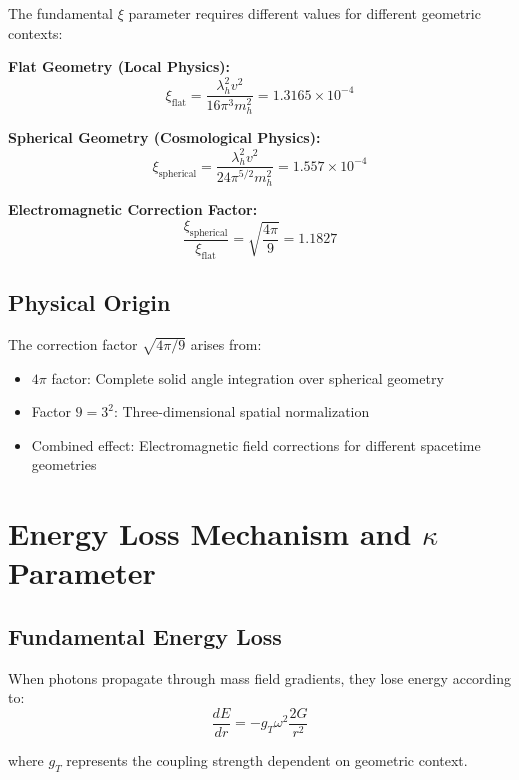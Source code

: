\documentclass[12pt,a4paper]{article}
\begin{document}
	The fundamental $\xi$ parameter requires different values for different geometric contexts:
	
	\textbf{Flat Geometry (Local Physics):}
	\begin{equation}
		\xi_{\text{flat}} = \frac{\lambda_h^2 v^2}{16\pi^3 m_h^2} = 1.3165 \times 10^{-4}
	\end{equation}
	
	\textbf{Spherical Geometry (Cosmological Physics):}
	\begin{equation}
		\xi_{\text{spherical}} = \frac{\lambda_h^2 v^2}{24\pi^{5/2} m_h^2} = 1.557 \times 10^{-4}
	\end{equation}
	
	\textbf{Electromagnetic Correction Factor:}
	\begin{equation}
		\frac{\xi_{\text{spherical}}}{\xi_{\text{flat}}} = \sqrt{\frac{4\pi}{9}} = 1.1827
	\end{equation}
	
	\subsection{Physical Origin}
	The correction factor $\sqrt{4\pi/9}$ arises from:
	\begin{itemize}
		\item $4\pi$ factor: Complete solid angle integration over spherical geometry
		\item Factor $9 = 3^2$: Three-dimensional spatial normalization
		\item Combined effect: Electromagnetic field corrections for different spacetime geometries
	\end{itemize}
	
	\section{Energy Loss Mechanism and $\kappa$ Parameter}
	
	\subsection{Fundamental Energy Loss}
	When photons propagate through mass field gradients, they lose energy according to:
	\begin{equation}
		\frac{dE}{dr} = -g_T \omega^2 \frac{2G}{r^2}
	\end{equation}
	
	where $g_T$ represents the coupling strength dependent on geometric context.
	
\end{document}
